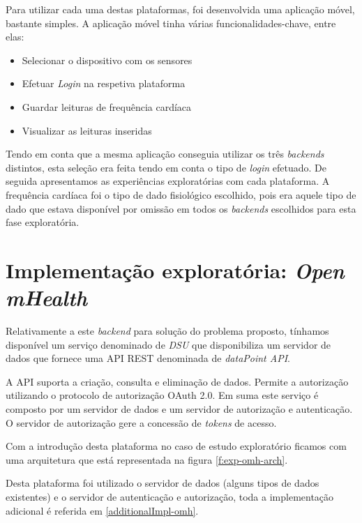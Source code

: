 Para utilizar cada uma destas plataformas, foi desenvolvida uma aplicação móvel, bastante simples. A aplicação móvel tinha várias funcionalidades-chave, entre elas:
\begin{itemize}
  \item Selecionar o dispositivo com os sensores
  \item Efetuar \textit{Login} na respetiva plataforma
  \item Guardar leituras de frequência cardíaca
  \item Visualizar as leituras inseridas
\end{itemize}

Tendo em conta que a mesma aplicação conseguia utilizar os três \textit{backends} distintos, esta seleção era feita tendo em conta o tipo de \textit{login} efetuado. De seguida apresentamos as experiências exploratórias com cada plataforma.
A frequência cardíaca foi o tipo de dado fisiológico escolhido, pois era aquele tipo de dado que estava disponível por omissão em todos os \textit{backends} escolhidos para esta fase exploratória. 
\newpage

\section{Implementação exploratória: \textit{Open mHealth}}
\label{cap4:exp-omh}
Relativamente a este \textit{backend} para solução do problema proposto, tínhamos disponível um serviço denominado de \textit{\gls{DSU}} que disponibiliza um servidor de dados que fornece uma \gls{API} \gls{REST} denominada de \textit{dataPoint API}. \par
A \gls{API} suporta a criação, consulta e eliminação de dados. Permite a autorização utilizando o protocolo de autorização OAuth 2.0. Em suma este serviço é composto por um servidor de dados e um servidor de autorização e autenticação. O servidor de autorização gere a concessão de \textit{tokens} de acesso. \cite{omhstorage} \par
Com a introdução desta plataforma no caso de estudo exploratório ficamos com uma arquitetura que está representada na figura \ref{f:exp-omh-arch}. \par
Desta plataforma foi utilizado o servidor de dados (alguns tipos de dados existentes) e o servidor de autenticação e autorização, toda a implementação adicional é referida em \ref{additionalImpl-omh}.

